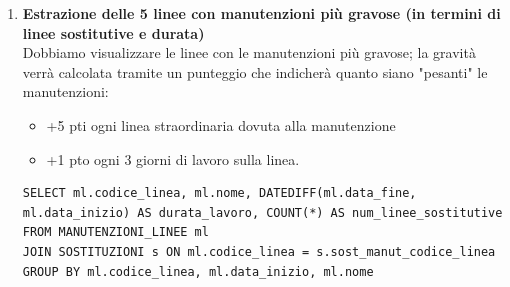 \documentclass[12pt,a4paper]{report}
\begin{document}
\begin{enumerate}[label=\textbf{\arabic*)}]
\item \textbf{Estrazione delle 5 linee con manutenzioni più gravose (in termini di linee sostitutive e durata)} \\
Dobbiamo visualizzare le linee con le manutenzioni più gravose; la gravità verrà calcolata tramite un punteggio che indicherà quanto siano "pesanti" le manutenzioni:
	    \begin{itemize}
		\renewcommand\labelitemi{--}
	        \item +5 pti ogni linea straordinaria dovuta alla manutenzione
	        \item +1 pto ogni 3 giorni di lavoro sulla  linea.
	    \end{itemize}
\begin{lstlisting}[style=sqlstyle, caption=Query for Duration of Maintenance and Substitute Lines Count]
SELECT ml.codice_linea, ml.nome, DATEDIFF(ml.data_fine, ml.data_inizio) AS durata_lavoro, COUNT(*) AS num_linee_sostitutive
FROM MANUTENZIONI_LINEE ml
JOIN SOSTITUZIONI s ON ml.codice_linea = s.sost_manut_codice_linea
GROUP BY ml.codice_linea, ml.data_inizio, ml.nome
\end{lstlisting}


\end{enumerate}
\end{document}

